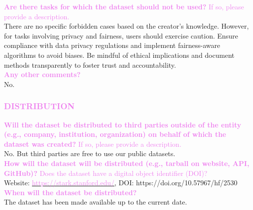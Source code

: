 \documentclass{article}
\newcommand{\sectioncolor}{Violet}
\begin{document}
    \textcolor{\sectioncolor}{\textbf{
    Are there tasks for which the dataset should not be used?
    }
    If so, please provide a description.
    } \\
    There are no specific forbidden cases based on the creator's knowledge. However, for tasks involving privacy and fairness, users should exercise caution. Ensure compliance with data privacy regulations and implement fairness-aware algorithms to avoid biases. Be mindful of ethical implications and document methods transparently to foster trust and accountability. \\

    \textcolor{\sectioncolor}{\textbf{
    Any other comments?
    }} \\
    No. \\

\begin{mdframed}[linecolor=\sectioncolor]
\subsubsection*{\textcolor{\sectioncolor}{
    DISTRIBUTION
}}
\end{mdframed}

    \textcolor{\sectioncolor}{\textbf{
    Will the dataset be distributed to third parties outside of the entity
    (e.g., company, institution, organization) on behalf of which the dataset
    was created?
    }
    If so, please provide a description.
    } \\
    No. But third parties are free to use our public datasets. \\

    \textcolor{\sectioncolor}{\textbf{
    How will the dataset will be distributed (e.g., tarball on website, API,
    GitHub)?
    }
    Does the dataset have a digital object identifier (DOI)?
    } \\
    Website: \href{https://stark.stanford.edu/}{\textcolor{Violet}{https://stark.stanford.edu/}},  DOI: https://doi.org/10.57967/hf/2530\\

    \textcolor{\sectioncolor}{\textbf{
    When will the dataset be distributed?
    }
    } \\
    The dataset has been made available up to the current date.\\
\end{document}
